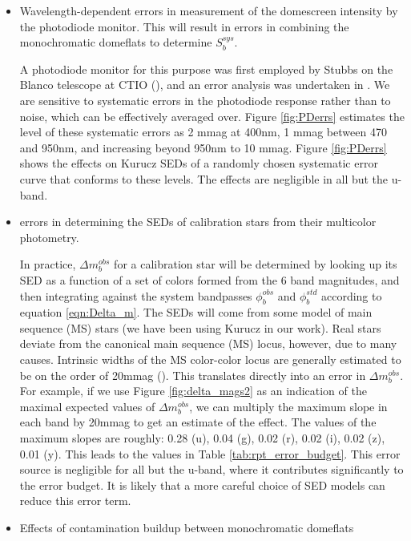 \documentclass[12pt,preprint]{aastex}
\begin{document}
\begin{itemize}
\item{Wavelength-dependent errors in measurement of the domescreen intensity by the photodiode monitor.  This will result in errors in combining the monochromatic domeflats to determine $S_b^{sys}$.}

A photodiode monitor for this purpose was first employed by Stubbs on the Blanco telescope at CTIO (\citep{Stubbs2007}), and an error analysis
was undertaken in \citep{Stubbs2010a} .  We are sensitive to systematic errors in the photodiode response rather than to noise, which can be effectively averaged over.  Figure \ref{fig:PDerrs} estimates the level of these systematic errors as 2 mmag at 400nm, 1 mmag between 470 and 950nm,
and increasing beyond 950nm to 10 mmag.  Figure \ref{fig:PDerrs} shows the effects on Kurucz SEDs of a randomly chosen systematic error curve that conforms to these levels.   The effects are negligible in all but the u-band.

\item{errors in determining the SEDs of calibration stars from their multicolor photometry.}

In practice, $\Delta m_b^{obs}$ for a calibration star will be determined by looking up its SED as a function of a set of
colors formed from the 6 band magnitudes, and then integrating against the system bandpasses $\phi_b^{obs}$ and $\phi_b^{std}$
according to equation \ref{eqn:Delta_m}.  The SEDs will come from some model of main sequence (MS) stars (we have been using Kurucz in 
our work).  Real stars deviate from the canonical main sequence (MS) locus, however, due to many causes.  Intrinsic widths of the MS
color-color locus are generally estimated to be on the order of 20mmag (\citep{Ivezic2007, High09}). This translates directly into an error in $\Delta m_b^{obs}$.  For example, if we use Figure \ref{fig:delta_mags2} as an indication of the maximal expected values of 
$\Delta m_b^{obs}$, we can multiply the maximum slope in each band by 20mmag to get an estimate of the effect.  The values of
the maximum slopes are roughly:  0.28 (u), 0.04 (g), 0.02 (r), 0.02 (i), 0.02 (z), 0.01 (y).  This leads to the values
in Table \ref{tab:rpt_error_budget}.  This error source is negligible for all but the u-band, 
where it contributes significantly to the error budget.  It is likely that a more careful choice of SED models can reduce this
error term.

\item{Effects of contamination buildup between monochromatic domeflats}


\end{itemize}
\end{document}
